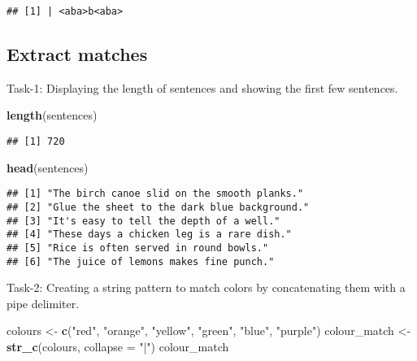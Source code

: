 \documentclass[
]{article}
\newenvironment{Shaded}{\begin{snugshade}}{\end{snugshade}}
\newcommand{\AttributeTok}[1]{\textcolor[rgb]{0.13,0.29,0.53}{#1}}
\newcommand{\FunctionTok}[1]{\textcolor[rgb]{0.13,0.29,0.53}{\textbf{#1}}}
\newcommand{\NormalTok}[1]{#1}
\newcommand{\OtherTok}[1]{\textcolor[rgb]{0.56,0.35,0.01}{#1}}
\newcommand{\StringTok}[1]{\textcolor[rgb]{0.31,0.60,0.02}{#1}}
\begin{document}
\begin{verbatim}
## [1] | <aba>b<aba>
\end{verbatim}

\hypertarget{extract-matches}{%
\subsection{Extract matches}\label{extract-matches}}

Task-1: Displaying the length of sentences and showing the first few
sentences.

\begin{Shaded}
\begin{Highlighting}[]
\FunctionTok{length}\NormalTok{(sentences)}
\end{Highlighting}
\end{Shaded}

\begin{verbatim}
## [1] 720
\end{verbatim}

\begin{Shaded}
\begin{Highlighting}[]
\FunctionTok{head}\NormalTok{(sentences)}
\end{Highlighting}
\end{Shaded}

\begin{verbatim}
## [1] "The birch canoe slid on the smooth planks." 
## [2] "Glue the sheet to the dark blue background."
## [3] "It's easy to tell the depth of a well."     
## [4] "These days a chicken leg is a rare dish."   
## [5] "Rice is often served in round bowls."       
## [6] "The juice of lemons makes fine punch."
\end{verbatim}

Task-2: Creating a string pattern to match colors by concatenating them
with a pipe delimiter.

\begin{Shaded}
\begin{Highlighting}[]
\NormalTok{colours }\OtherTok{\textless{}{-}} \FunctionTok{c}\NormalTok{(}\StringTok{"red"}\NormalTok{, }\StringTok{"orange"}\NormalTok{, }\StringTok{"yellow"}\NormalTok{, }\StringTok{"green"}\NormalTok{, }\StringTok{"blue"}\NormalTok{, }\StringTok{"purple"}\NormalTok{)}
\NormalTok{colour\_match }\OtherTok{\textless{}{-}} \FunctionTok{str\_c}\NormalTok{(colours, }\AttributeTok{collapse =} \StringTok{"|"}\NormalTok{)}
\NormalTok{colour\_match}
\end{Highlighting}
\end{Shaded}
\end{document}
